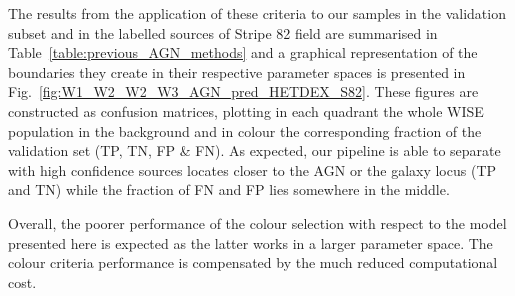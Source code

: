 \documentclass{aa}
\begin{document}
The results from the application of these criteria to our samples in the validation subset and in the labelled sources of Stripe 82 field are summarised in Table~\ref{table:previous_AGN_methods} and a graphical representation of the boundaries they create in their respective parameter spaces is presented in Fig.~\ref{fig:W1_W2_W2_W3_AGN_pred_HETDEX_S82}. These figures are constructed as confusion matrices, plotting in each quadrant the whole WISE population in the background and in colour the corresponding fraction of the validation set (TP, TN, FP \& FN). As expected, our pipeline is able to separate with high confidence sources locates closer to the AGN or the galaxy locus (TP and TN) while the fraction of FN and FP lies somewhere in the middle.

Overall, the poorer performance of the colour selection with respect to the model presented here is expected as the latter works in a larger parameter space. The colour criteria performance is compensated by the much reduced computational cost.
\end{document}
